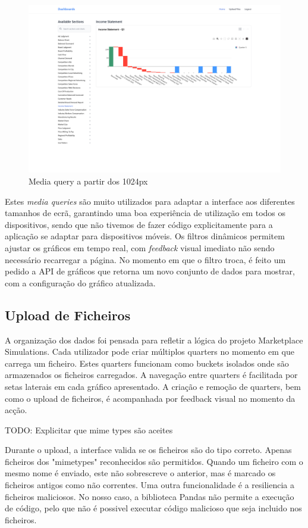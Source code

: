 \begin{figure}[H]
    \centering
    \includegraphics[width=\textwidth]{./img/res_1920}
 \caption{Media query a partir dos 1024px}
\end{figure}

Estes \textit{media queries} são muito utilizados para adaptar a interface aos diferentes tamanhos de ecrã, garantindo uma boa experiência de utilização em todos os dispositivos, sendo que não tivemos de fazer código explicitamente para a aplicação se adaptar para dispositivos móveis. Os filtros dinâmicos permitem ajustar os gráficos em tempo real, com \textit{feedback} visual imediato não sendo necessário recarregar a página. No momento em que o filtro troca, é feito um pedido a API de gráficos que retorna um novo conjunto de dados para mostrar, com a configuração do gráfico atualizada.

\subsection{Upload de Ficheiros}

A organização dos dados foi pensada para refletir a lógica do projeto Marketplace Simulations. Cada utilizador pode criar múltiplos quarters no momento em que carrega um ficheiro. Estes quarters funcionam como buckets isolados onde são armazenados os ficheiros carregados. A navegação entre quarters é facilitada por setas laterais em cada gráfico apresentado. A criação e remoção de quarters, bem como o upload de ficheiros, é acompanhada por feedback visual no momento da acção.

TODO: Explicitar que mime types são aceites

Durante o upload, a interface valida se os ficheiros são do tipo correto. Apenas ficheiros dos "mimetypes" reconhecidos são permitidos. Quando um ficheiro com o mesmo nome é enviado, este não sobrescreve o anterior,  mas é marcado os ficheiros antigos como não correntes. Uma outra funcionalidade é a resiliencia a ficheiros maliciosos. No nosso caso, a biblioteca Pandas não permite a execução de código, pelo que não é possivel executar código malicioso que seja incluido nos ficheiros. 

